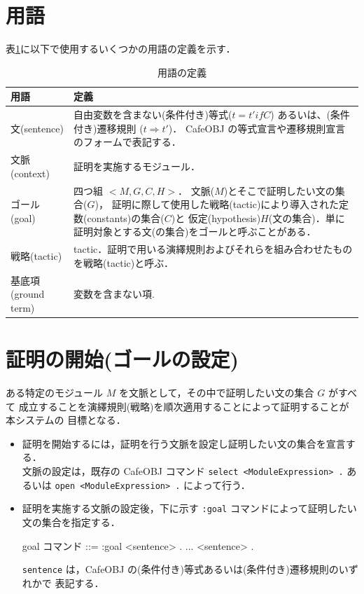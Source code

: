 \documentclass[a4paper,oneside,10pt,here]{memoir}
\newenvironment{vvtm}%
{\parskip=0pt\lineskip=0pt\begin{center}\begin{minipage}{0.8\textwidth}\begin{snugshade}}%
  {\end{snugshade}\end{minipage}\end{center}}
\begin{document}
\section{用語}\label{sec:terms}
表\ref{table:terms}に以下で使用するいくつかの用語の定義を示す．

\begin{table}
\caption{用語の定義}
\label{table:terms}
\begin{center}
\begin{tabular}[tbhp]{|l|p{}|}\hline
用語 & 定義 \\\hline\hline
文(sentence)   & 自由変数を含まない(条件付き)等式($t = t' if C$) あるいは、(条件付き)遷移規則 ($t \Rightarrow t'$)．
CafeOBJ の等式宣言や遷移規則宣言のフォームで表記する． \\\hline 
文脈(context) & 証明を実施するモジュール．\\\hline
ゴール(goal) & 四つ組 $<M,G,C,H>$． 文脈($M$)とそこで証明したい文の集合($G$)，
証明に際して使用した戦略(tactic)により導入された定数(constants)の集合($C$)と
仮定(hypothesis)$H$(文の集合)．単に証明対象とする文(の集合)をゴールと呼ぶことがある．\\\hline
戦略(tactic) & tactic．証明で用いる演繹規則およびそれらを組み合わせたものを戦略(tactic)と呼ぶ．\\\hline
基底項(ground term) & 変数を含まない項. \\\hline
\end{tabular}
\end{center}
\end{table}

\section{証明の開始(ゴールの設定)} \label{sec:start-proof}
ある特定のモジュール $M$ を文脈として，その中で証明したい文の集合 $G$ がすべて
成立することを演繹規則(戦略)を順次適用することによって証明することが本システムの
目標となる．

\begin{itemize}
\item 証明を開始するには，証明を行う文脈を設定し証明したい文の集合を宣言する．\\
  文脈の設定は，既存の CafeOBJ コマンド \verb|select <ModuleExpression> .| あるいは \verb|open <ModuleExpression> .|
  によって行う．
\item 証明を実施する文脈の設定後，下に示す \verb|:goal| コマンドによって証明したい文の集合を指定する．\\
  \begin{vvtm}
    \begin{simplev}
    goal コマンド ::= :goal { <sentence> .  ...  <sentence> . }      
    \end{simplev}
  \end{vvtm}
  \verb|sentence| は，CafeOBJ の(条件付き)等式あるいは(条件付き)遷移規則のいずれかで
  表記する．
\end{itemize}
\end{document}
